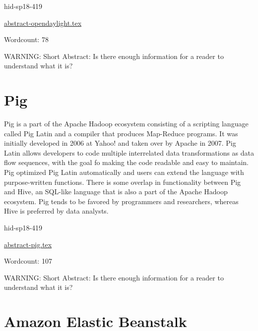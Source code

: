 \begin{IU}

hid-sp18-419

\href{https://github.com/cloudmesh-community/hid-sp18-419/blob/master//technology/abstract-opendaylight.tex}{abstract-opendaylight.tex}

 

Wordcount: 78

WARNING: Short Abstract: Is there enough information for a reader to understand what it is?

\end{IU}

\section{Pig}

Pig is a part of the Apache Hadoop ecosystem consisting of a scripting
language called Pig Latin and a compiler that produces Map-Reduce
programs. It was initially developed in 2006 at Yahoo! and taken over
by Apache in 2007\cite{hid-sp18-419-die2015datascience}. Pig Latin
allows developers to code multiple interrelated data transformations
as data flow sequences, with the goal fo making the code readable and
easy to maintain. Pig optimized Pig Latin automatically and users can
extend the language with purpose-written
functions\cite{hid-sp18-419-www-pig}. There is some overlap in
functionality between Pig and Hive, an SQL-like language that is also
a part of the Apache Hadoop ecosystem. Pig tends to be favored by
programmers and researchers, whereas Hive is preferred by data
analysts\cite{hid-sp18-419-www-dezyre-pig}.


\begin{IU}

hid-sp18-419

\href{https://github.com/cloudmesh-community/hid-sp18-419/blob/master//technology/abstract-pig.tex}{abstract-pig.tex}

 

Wordcount: 107

WARNING: Short Abstract: Is there enough information for a reader to understand what it is?

\end{IU}

\section{Amazon Elastic Beanstalk}

